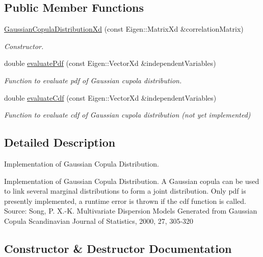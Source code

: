 \subsection*{Public Member Functions}
\begin{DoxyCompactItemize}
\item 
\hyperlink{classtudat_1_1statistics_1_1GaussianCopulaDistributionXd_a2673f53188b4648ce6a7cdf70b2e43e3}{Gaussian\+Copula\+Distribution\+Xd} (const Eigen\+::\+Matrix\+Xd \&correlation\+Matrix)
\begin{DoxyCompactList}\small\item\em Constructor. \end{DoxyCompactList}\item 
double \hyperlink{classtudat_1_1statistics_1_1GaussianCopulaDistributionXd_afa1a343fc638373f6df65402327f2135}{evaluate\+Pdf} (const Eigen\+::\+Vector\+Xd \&independent\+Variables)
\begin{DoxyCompactList}\small\item\em Function to evaluate pdf of Gaussian cupola distribution. \end{DoxyCompactList}\item 
double \hyperlink{classtudat_1_1statistics_1_1GaussianCopulaDistributionXd_a0c12013ebf12d3c5418431fef33fc2a8}{evaluate\+Cdf} (const Eigen\+::\+Vector\+Xd \&independent\+Variables)
\begin{DoxyCompactList}\small\item\em Function to evaluate cdf of Gaussian cupola distribution (not yet implemented) \end{DoxyCompactList}\end{DoxyCompactItemize}


\subsection{Detailed Description}
Implementation of Gaussian Copula Distribution. 

Implementation of Gaussian Copula Distribution. A Gaussian copula can be used to link several marginal distributions to form a joint distribution. Only pdf is presently implemented, a runtime error is thrown if the cdf function is called. Source\+: Song, P. X.-\/K. Multivariate Dispersion Models Generated from Gaussian Copula Scandinavian Journal of Statistics, 2000, 27, 305-\/320 

\subsection{Constructor \& Destructor Documentation}
